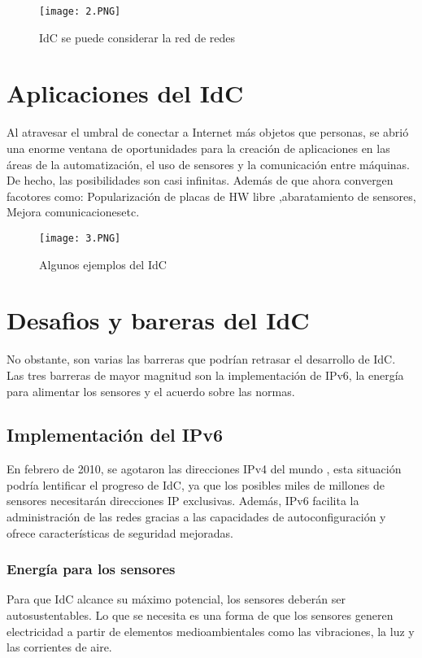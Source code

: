 \documentclass[12pt,letterpaper]{article}
\begin{document}
\begin{figure}[hbtp]
\centering
\texttt{[image: 2.PNG]}
\caption{IdC se puede considerar la red de redes}
\end{figure}

\section*{Aplicaciones del IdC}
Al atravesar el umbral de conectar a Internet más objetos que personas, se abrió una enorme
ventana de oportunidades para la creación de aplicaciones en las áreas de la automatización,
el uso de sensores y la comunicación entre máquinas. De hecho, las posibilidades son casi
infinitas. Además de que ahora convergen facotores como: Popularización de placas de HW libre ,abaratamiento de sensores, Mejora comunicacionesetc.

\begin{figure}[hbtp]
\centering
\texttt{[image: 3.PNG]}
\caption{Algunos ejemplos del IdC}
\end{figure}

\section*{Desafios y bareras del IdC}
No obstante, son varias las barreras que podrían retrasar el desarrollo de IdC. Las tres
barreras de mayor magnitud son la implementación de IPv6, la energía para alimentar los
sensores y el acuerdo sobre las normas.
\subsection*{Implementación del IPv6} 
En febrero de 2010, se agotaron las direcciones IPv4 del mundo , esta situación podría lentificar el
progreso de IdC, ya que los posibles miles de millones de sensores necesitarán direcciones
IP exclusivas. Además, IPv6 facilita la administración de las redes gracias a las capacidades
de autoconfiguración y ofrece características de seguridad mejoradas.

\subsubsection*{Energía para los sensores}
Para que IdC alcance su máximo potencial, los sensores deberán
ser autosustentables.  Lo que se necesita es una forma de que los sensores generen electricidad a partir de elementos
medioambientales como las vibraciones, la luz y las corrientes de aire.
\end{document}
